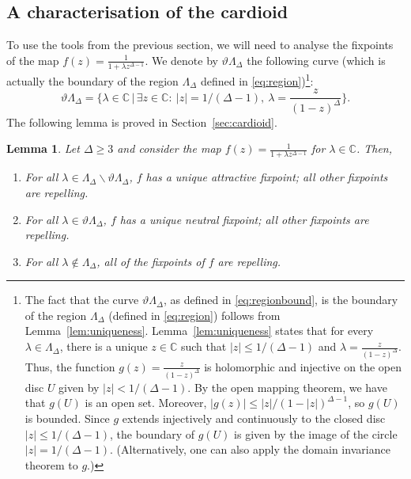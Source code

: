 \documentclass[11pt]{article}
\newtheorem{lemma}[theorem]{Lemma}
\def\Complex{\mathbb{C}}
\def\LambdaD{\Lambda_\Delta}
\def\tLambdaD{\vartheta\Lambda_\Delta}
\begin{document}
\subsection{A characterisation of the cardioid}\label{sec:tg4gt3}
To use the tools from the previous section, we will need to analyse the fixpoints of the map $f(z)=\frac{1}{1+\lambda z^{\Delta-1}}$. We denote by $\tLambdaD$ the following curve  (which is actually the boundary of the region $\LambdaD$ defined in \eqref{eq:region})\footnote{The fact that the curve $\tLambdaD$, as defined in \eqref{eq:regionbound}, is the boundary of the region $\LambdaD$ (defined in \eqref{eq:region}) follows from Lemma~\ref{lem:uniqueness}.
Lemma~\ref{lem:uniqueness} 
states that 
for every $\lambda\in \LambdaD$, there is a unique $z\in \mathbb{C}$ such that $|z|\leq 1/(\Delta-1)$ and $\lambda=\frac{z}{(1-z)^{\Delta}}$.
Thus, the function 
$g(z)=\frac{z}{(1-z)^{\Delta}}$ is holomorphic and injective on the open disc $U$ given by $|z|<1/(\Delta-1)$. By the open mapping theorem, we have that $g(U)$ is an open set. Moreover, $|g(z)|\leq |z|/(1-|z|)^{\Delta-1}$, so $g(U)$ is bounded.  Since $g$ extends injectively and continuously to the closed disc $|z|\leq 1/(\Delta-1)$, the boundary of $g(U)$ is given by the image of the circle $|z|=1/(\Delta-1)$. (Alternatively, one can also apply the domain invariance theorem to $g$.)}:
\begin{equation}\label{eq:regionbound}
\tLambdaD=\Big\{\lambda \in \mathbb{C}\,\big|\,\exists z\in \mathbb{C}:\ |z|= 1/(\Delta-1),\ \lambda=\frac{z}{(1-z)^{\Delta}}\Big\}.
\end{equation}
The following lemma is proved in Section~\ref{sec:cardioid}. 
\begin{lemma}\label{lem:fixpoints}
Let $\Delta\geq 3$ and consider the map $f(z)=\frac{1}{1+\lambda z^{\Delta-1}}$ for $\lambda \in\Complex$. Then,
\begin{enumerate}
\item For all $\lambda\in \LambdaD\backslash \tLambdaD$, $f$ has a unique attractive fixpoint; all other fixpoints are repelling.
\item For all $\lambda\in \tLambdaD$, $f$ has a unique neutral fixpoint; all other fixpoints are repelling.
\item For all $\lambda\notin \LambdaD$, all of the fixpoints of $f$ are repelling.
\end{enumerate}
\end{lemma}
\end{document}
